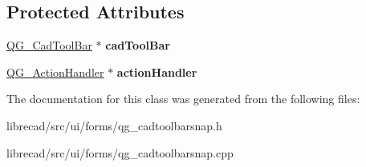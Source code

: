 \subsection*{Protected Attributes}
\begin{DoxyCompactItemize}
\item 
\hypertarget{classQG__CadToolBarSnap_ad5907aaf5cc49373d2b47fa13614f7f8}{\hyperlink{classQG__CadToolBar}{Q\-G\-\_\-\-Cad\-Tool\-Bar} $\ast$ {\bfseries cad\-Tool\-Bar}}\label{classQG__CadToolBarSnap_ad5907aaf5cc49373d2b47fa13614f7f8}

\item 
\hypertarget{classQG__CadToolBarSnap_a1806183036ed8ab1f181202958cc6e2c}{\hyperlink{classQG__ActionHandler}{Q\-G\-\_\-\-Action\-Handler} $\ast$ {\bfseries action\-Handler}}\label{classQG__CadToolBarSnap_a1806183036ed8ab1f181202958cc6e2c}

\end{DoxyCompactItemize}


The documentation for this class was generated from the following files\-:\begin{DoxyCompactItemize}
\item 
librecad/src/ui/forms/qg\-\_\-cadtoolbarsnap.\-h\item 
librecad/src/ui/forms/qg\-\_\-cadtoolbarsnap.\-cpp\end{DoxyCompactItemize}
